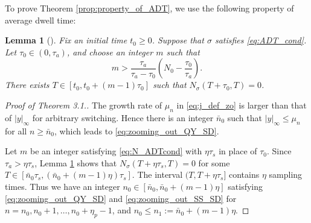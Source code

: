 \documentclass[letterpaper, 11pt, onecolumn]{ieeeconf}  \IEEEoverridecommandlockouts
\newtheorem{lemma}[theorem]{Lemma}
\begin{document}
To prove Theorem \ref{prop:property_of_ADT}, 
we use the following property of average dwell time:
\begin{lemma}[\cite{WakaikiMTNS2014}]
\label{lem:ADT_upperbound}
{\em
Fix an initial time $t_0 \geq 0$.
Suppose that $\sigma$ satisfies \eqref{eq:ADT_cond}.
Let $\tau_0 \in (0, \tau_a)$, and choose an integer $m$ such that
\begin{equation}
\label{eq:N_ADTcond}
m > \frac{\tau_a}{\tau_a - \tau_0} \left( N_0 - \frac{\tau_0}{\tau_a} \right).
\end{equation}
There exists $T \in [t_0, t_0+(m-1)\tau_0]$ such that 
$N_{\sigma}(T+\tau_0,T) = 0$.
}
\end{lemma}



\begin{proof}[Proof of Theorem 3.1.]
The growth rate of $\mu_n$ in \eqref{eq:j_def_zo} is 
larger than that of $|y|_{\infty}$ for arbitrary switching. Hence
there is an integer $\bar{n}_0$ such that $| y |_{\infty} \leq \mu_{n}$
for all $n \geq \bar{n}_0$, which leads to \eqref{eq:zooming_out_QY_SD}.

Let $m$ be an integer satisfying \eqref{eq:N_ADTcond} with 
$\eta \tau_s$ in place of $\tau_0$.
Since $\tau_a > \eta \tau_s$,
Lemma \ref{lem:ADT_upperbound} shows that
$
N_{\sigma}(T + \eta \tau_s,T) = 0
$
for some $T \in [\bar{n}_0 \tau_s, (\bar{n}_0 + (m-1)\eta ) \tau_s ]$.
The interval $(T, T+ \eta \tau_s]$ contains $\eta$ sampling times. Thus
we have an integer $n_0 \in [\bar{n}_0, \bar{n}_0 + (m-1) \eta]$ satisfying
\eqref{eq:zooming_out_QY_SD} and \eqref{eq:zooming_out_SS_SD}
for $n =n_0,n_0+1,\dots, n_0 + \eta_p - 1$, and $n_0 \leq n_1 := 
\bar{n}_0 + (m-1) \eta$.
\end{proof}
\end{document}
